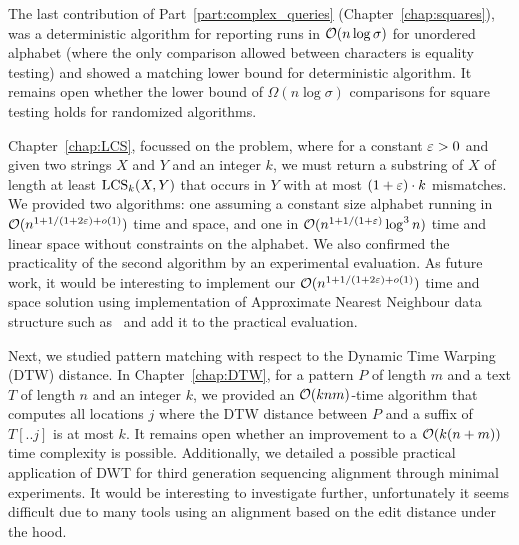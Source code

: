 The last contribution of Part~\ref{part:complex_queries} (Chapter~\ref{chap:squares}), was a deterministic algorithm for reporting runs in $\mathcal{O}(n\log\sigma)$ for unordered alphabet (where the only comparison allowed between characters is equality testing) and showed a matching lower bound for deterministic algorithm. It remains open whether the lower bound of $\Omega(n\log \sigma)$ comparisons for square testing holds for randomized algorithms.


Chapter~\ref{chap:LCS}, focussed on the \kApproxLCS problem, where for a constant $\varepsilon > 0$ and given two strings $X$ and $Y$ and an integer $k$, we must return a substring of $X$ of length at least $\mathrm{LCS}_{k}(X,Y)$ that occurs in $Y$ with at most $(1+\varepsilon) \cdot k$ mismatches. We provided two algorithms: one assuming a constant size alphabet running in $\mathcal{O}(n^{1+ 1/(1+2\varepsilon) + o(1)})$ time and space, and one in $\mathcal{O}(n^{1+1/(1+\varepsilon)} \log^3 n)$ time and linear space without constraints on the alphabet.  We also confirmed the practicality of the second algorithm by an experimental evaluation.
As future work, it would be interesting to implement our $\mathcal{O}(n^{1+ 1/(1+2\varepsilon) + o(1)})$ time and space solution using implementation of Approximate Nearest Neighbour data structure such as~\cite{spotify_annoy} and add it to the practical evaluation.

Next, we studied pattern matching with respect to the Dynamic Time Warping (DTW) distance. In Chapter~\ref{chap:DTW}, for a pattern $P$ of length $m$ and a text $T$ of length $n$ and an integer $k$, we provided an $\mathcal{O}(knm)$-time algorithm that computes all locations $j$ where the DTW distance between $P$ and a suffix of $T[..j]$ is at most $k$. It remains open whether an improvement to a $\mathcal{O}(k(n+m))$ time complexity is possible. Additionally, we detailed a possible practical application of DWT for third generation sequencing alignment through minimal experiments. It
would be interesting to investigate further, unfortunately it seems difficult due to many tools using an alignment based on the edit distance under the hood.    

